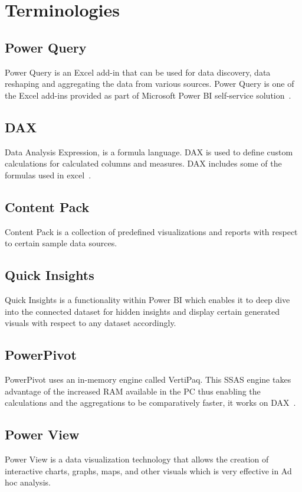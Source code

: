 \section{Terminologies}

\subsection{Power Query}
Power Query is an Excel add-in that can be used for data 
discovery, data reshaping and aggregating the data from various sources. 
Power Query is one of the Excel add-ins provided as part of Microsoft Power 
BI self-service solution~\cite{hid-sp18-418-powerbi-intro}.

\subsection{DAX}
Data Analysis Expression, is a formula language. DAX is used to define 
custom calculations for calculated columns and measures. DAX includes some of 
the formulas used in excel~\cite{hid-sp18-418-dax-basics}.

\subsection{Content Pack}
Content Pack is a collection of predefined visualizations and reports 
with respect to certain sample data sources.

\subsection{Quick Insights}
Quick Insights is a functionality within Power BI which enables it to 
deep dive into the connected dataset for hidden insights and display certain generated 
visuals with respect to any dataset accordingly.

\subsection{PowerPivot}
PowerPivot uses an in-memory engine called VertiPaq. 
This SSAS engine takes advantage of the increased RAM available in the 
PC thus enabling the calculations and the aggregations to be comparatively 
faster, it works on DAX~\cite{hid-sp18-418-powerpivot}.

\subsection{Power View}
Power View is a data visualization technology that allows the 
creation of interactive charts, graphs, maps, and other visuals which is 
very effective in Ad hoc analysis.

